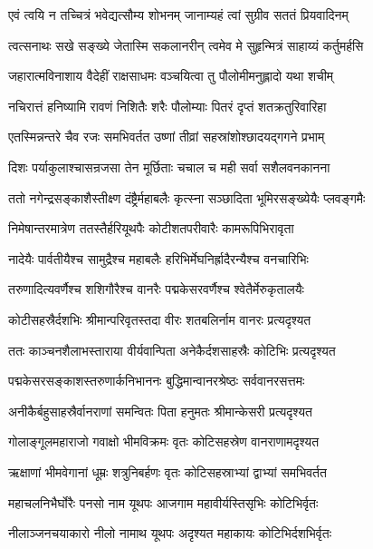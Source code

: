 \twolineshloka
{एवं त्वयि न तच्चित्रं भवेद्यत्सौम्य शोभनम्}
{जानाम्यहं त्वां सुग्रीव सततं प्रियवादिनम्} %

\twolineshloka
{त्वत्सनाथः सखे सङ्ख्ये जेतास्मि सकलानरीन्}
{त्वमेव मे सुहृन्मित्रं साहाय्यं कर्तुमर्हसि} %

\twolineshloka
{जहारात्मविनाशाय वैदेहीं राक्षसाधमः}
{वञ्चयित्वा तु पौलोमीमनुह्लादो यथा शचीम्} %

\twolineshloka
{नचिरात्तं हनिष्यामि रावणं निशितैः शरैः}
{पौलोम्याः पितरं दृप्तं शतक्रतुरिवारिहा} %

\twolineshloka
{एतस्मिन्नन्तरे चैव रजः समभिवर्तत}
{उष्णां तीव्रां सहस्रांशोश्छादयद्गगने प्रभाम्} %

\twolineshloka
{दिशः पर्याकुलाश्चासन्रजसा तेन मूर्छिताः}
{चचाल च मही सर्वा सशैलवनकानना} %

\twolineshloka
{ततो नगेन्द्रसङ्काशैस्तीक्ष्ण दंष्ट्रैर्महाबलैः}
{कृत्स्ना सञ्छादिता भूमिरसङ्ख्येयैः प्लवङ्गमैः} %

\twolineshloka
{निमेषान्तरमात्रेण ततस्तैर्हरियूथपैः}
{कोटीशतपरीवारैः कामरूपिभिरावृता} %

\twolineshloka
{नादेयैः पार्वतीयैश्च सामुद्रैश्च महाबलैः}
{हरिभिर्मेघनिर्ह्रादैरन्यैश्च वनचारिभिः} %

\twolineshloka
{तरुणादित्यवर्णैश्च शशिगौरैश्च वानरैः}
{पद्मकेसरवर्णैश्च श्वेतैर्मेरुकृतालयैः} %

\twolineshloka
{कोटीसहस्रैर्दशभिः श्रीमान्परिवृतस्तदा}
{वीरः शतबलिर्नाम वानरः प्रत्यदृश्यत} %

\twolineshloka
{ततः काञ्चनशैलाभस्ताराया वीर्यवान्पिता}
{अनेकैर्दशसाहस्रैः कोटिभिः प्रत्यदृश्यत} %

\twolineshloka
{पद्मकेसरसङ्काशस्तरुणार्कनिभाननः}
{बुद्धिमान्वानरश्रेष्ठः सर्ववानरसत्तमः} %

\twolineshloka
{अनीकैर्बहुसाहस्रैर्वानराणां समन्वितः}
{पिता हनुमतः श्रीमान्केसरी प्रत्यदृश्यत} %

\twolineshloka
{गोलाङ्गूलमहाराजो गवाक्षो भीमविक्रमः}
{वृतः कोटिसहस्रेण वानराणामदृश्यत} %

\twolineshloka
{ऋक्षाणां भीमवेगानां धूम्रः शत्रुनिबर्हणः}
{वृतः कोटिसहस्राभ्यां द्वाभ्यां समभिवर्तत} %

\twolineshloka
{महाचलनिभैर्घोरैः पनसो नाम यूथपः}
{आजगाम महावीर्यस्तिसृभिः कोटिभिर्वृतः} %

\twolineshloka
{नीलाञ्जनचयाकारो नीलो नामाथ यूथपः}
{अदृश्यत महाकायः कोटिभिर्दशभिर्वृतः} %

